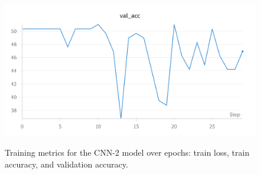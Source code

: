 \documentclass{article}
\begin{document}
\begin{figure}[hbtp]
    \begin{minipage}{0.6\textwidth}
        \centering
        \includegraphics[width=\textwidth]{Images/cnn2_val_acc.png}
        \label{fig:cnn2_val_acc}
    \end{minipage}

    \caption{Training metrics for the CNN-2 model over epochs: train loss, train accuracy, and validation accuracy.}
    \label{fig:cnn2_training_metrics}
\end{figure}
\end{document}
